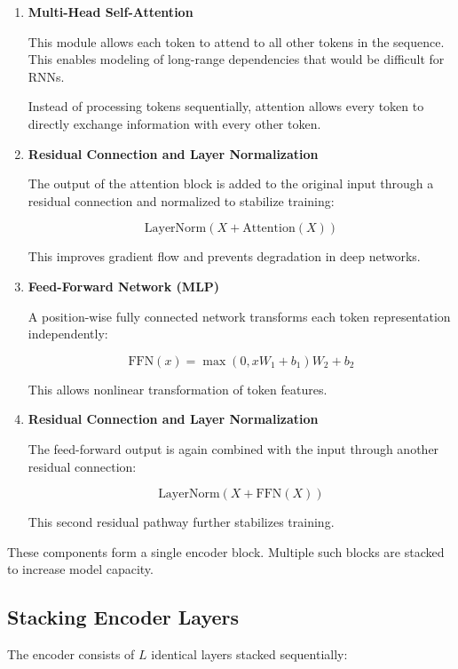 \documentclass[11pt]{article}
\begin{document}
\begin{enumerate}

\item \textbf{Multi-Head Self-Attention}

This module allows each token to attend to all other tokens in the sequence. This enables modeling of long-range dependencies that would be difficult for RNNs.

Instead of processing tokens sequentially, attention allows every token to directly exchange information with every other token.

\item \textbf{Residual Connection and Layer Normalization}

The output of the attention block is added to the original input through a residual connection and normalized to stabilize training:

\[
\text{LayerNorm}(X + \text{Attention}(X))
\]

This improves gradient flow and prevents degradation in deep networks.

\item \textbf{Feed-Forward Network (MLP)}

A position-wise fully connected network transforms each token representation independently:

\[
\text{FFN}(x)
=
\max(0, xW_1 + b_1)W_2 + b_2
\]

This allows nonlinear transformation of token features.

\item \textbf{Residual Connection and Layer Normalization}

The feed-forward output is again combined with the input through another residual connection:

\[
\text{LayerNorm}(X + \text{FFN}(X))
\]

This second residual pathway further stabilizes training.

\end{enumerate}

These components form a single encoder block. Multiple such blocks are stacked to increase model capacity.

\subsection{Stacking Encoder Layers}

The encoder consists of $L$ identical layers stacked sequentially:
\end{document}
